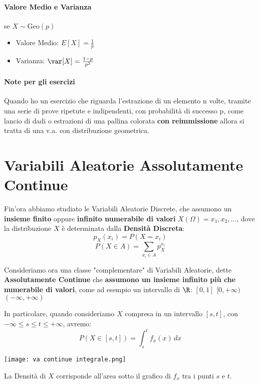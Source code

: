 	\paragraph*{Valore Medio e Varianza} se $X\sim \text{Geo}(p)$
	\begin{itemize}
		\item Valore Medio: $E[X] = \frac{1}{p}$
		\item Varianza: $\var[X] = \frac{1-p}{p^2}$
	\end{itemize}
	\paragraph*{Note per gli esercizi}
	Quando ho un esercizio che riguarda l'estrazione di un elemento n volte, tramite una serie
	di prove ripetute e indipendenti, con probabilità di successo p, come lancio di dadi o
	estrazioni di una pallina colorata \textbf{con reimmissione} allora si tratta di una v.a. con
	distribuzione geometrica.


	\section{Variabili Aleatorie Assolutamente Continue}

	Fin'ora abbiamo studiato le Variabili Aleatorie Discrete, che assumono un \textbf{insieme finito} oppure
	\textbf{infinito numerabile di valori} $X(\Omega) = {x_1, x_2, \dots}$, dove la distribuzione
$X$ è determinata dalla \textbf{Densità Discreta}:
	\[
		p_X(x_i) = P(X=x_i)
	\]
	\[
		P(X \in A) = \sum_{x_i \in A}p_X^{x_i}
	\]

	Consideriamo ora una classe "complementare" di Variabili Aleatorie, dette \textbf{Assolutamente Continue}
	che \textbf{assumono un insieme infinito più che numerabile di valori}, come ad esempio un intervallo
	di $\R$:
$[0, 1]$ $[0, +\infty)$ $(-\infty, +\infty)$

	In particolare, quando consideriamo $X$ compresa in un intervallo $[s,t]$,
	con $-\infty \leq s \leq t \leq +\infty$, avremo:
	\[
		P(X\in[s,t]) = \int_{s}^{t} f_x (x)\,dx
	\]
	\begin{center}
		\texttt{[image: va continue integrale.png]}
	\end{center}
	La Densità di $X$ corrisponde all'area sotto il grafico di $f_x$ tra i punti $s$ e $t$.
